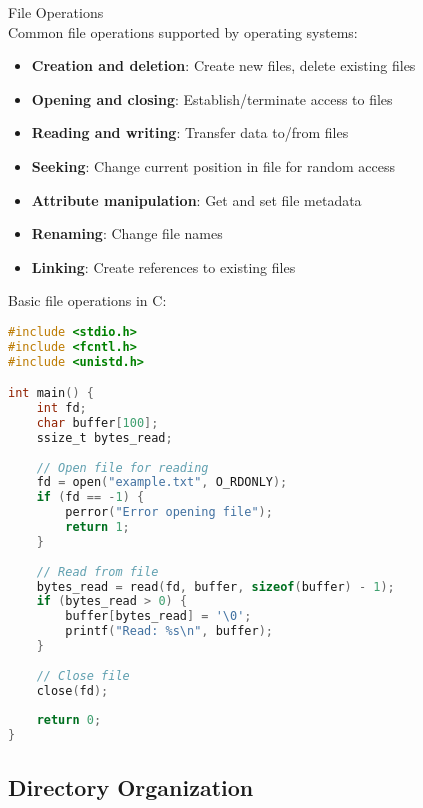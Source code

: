\begin{definition}{File Operations}\\
    Common file operations supported by operating systems:
    \begin{itemize}
        \item \textbf{Creation and deletion}: Create new files, delete existing files
        \item \textbf{Opening and closing}: Establish/terminate access to files
        \item \textbf{Reading and writing}: Transfer data to/from files
        \item \textbf{Seeking}: Change current position in file for random access
        \item \textbf{Attribute manipulation}: Get and set file metadata
        \item \textbf{Renaming}: Change file names
        \item \textbf{Linking}: Create references to existing files
    \end{itemize}
\end{definition}

\begin{example}
    Basic file operations in C:
    
\begin{lstlisting}[language=C, style=basesmol]
#include <stdio.h>
#include <fcntl.h>
#include <unistd.h>

int main() {
    int fd;
    char buffer[100];
    ssize_t bytes_read;
    
    // Open file for reading
    fd = open("example.txt", O_RDONLY);
    if (fd == -1) {
        perror("Error opening file");
        return 1;
    }
    
    // Read from file
    bytes_read = read(fd, buffer, sizeof(buffer) - 1);
    if (bytes_read > 0) {
        buffer[bytes_read] = '\0';
        printf("Read: %s\n", buffer);
    }
    
    // Close file
    close(fd);
    
    return 0;
}
\end{lstlisting}
\end{example}

\subsection{Directory Organization}


